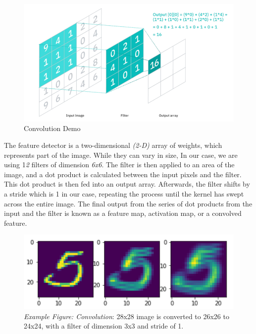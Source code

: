 \documentclass[conference]{IEEEtran}
\begin{document}
\begin{figure}[h]
  \centering
  \includegraphics[scale=0.3]{images/conv_demo.png}
  \caption{Convolution Demo\cite{Conv_layer_2020}}
  \label{fig:Conv_demo}
\end{figure}


The feature detector is a two-dimensional \emph{(2-D)} array of weights, which represents part of the image. While they can vary in size, In our case, we are using 1\emph{2} filters of dimension \emph{6x6}. The filter is then applied to an area of the image, and a dot product is calculated between the input pixels and the filter. This dot product is then fed into an output array. Afterwards, the filter shifts by a stride which is 1 in our case, repeating the process until the kernel has swept across the entire image. The final output from the series of dot products from the input and the filter is known as a feature map, activation map, or a convolved feature.




\begin{figure}[h]
  \centering
  \includegraphics[scale=0.4]{images/conv.png}
  \caption{\emph{Example Figure: Convolution}: 28x28 image is converted to 26x26 to 24x24, with a filter of dimension 3x3 and stride of 1.}
  \label{fig:Convolution}
\end{figure}
\end{document}
